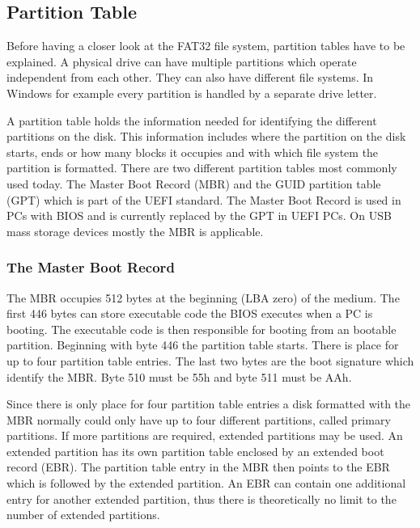 \subsection{Partition Table}

Before having a closer look at the FAT32 file system, partition tables have to be explained. A physical drive can have multiple partitions which operate independent from each other. They can also have different file systems. In Windows for example every partition is handled by a separate drive letter.

A partition table holds the information needed for identifying the different partitions on the disk. This information includes where the partition on the disk starts, ends or how many blocks it occupies and with which file system the partition is formatted. There are two different partition tables most commonly used today. The Master Boot Record (MBR) and the GUID partition table (GPT) which is part of the UEFI standard\cite{wiki_guid}. The Master Boot Record is used in PCs with BIOS and is currently replaced by the GPT in UEFI PCs. On USB mass storage devices mostly the MBR is applicable. 

\subsubsection{The Master Boot Record}

The MBR occupies 512 bytes at the beginning (LBA zero) of the medium. The first 446 bytes can store executable code the BIOS executes when a PC is booting. The executable code is then responsible for booting from an bootable partition. Beginning with byte 446 the partition table starts. There is place for up to four partition table entries. The last two bytes are the boot signature which identify the MBR. Byte 510 must be 55h and byte 511 must be AAh\cite{fat_paul}.

Since there is only place for four partition table entries a disk formatted with the MBR normally could only have up to four different partitions, called primary partitions. If more partitions are required, extended partitions may be used. An extended partition has its own partition table enclosed by an extended boot record (EBR). The partition table entry in the MBR then points to the EBR which is followed by the extended partition. An EBR can contain one additional entry for another extended partition, thus there is theoretically no limit to the number of extended partitions\cite{usb_ms_jan}.

